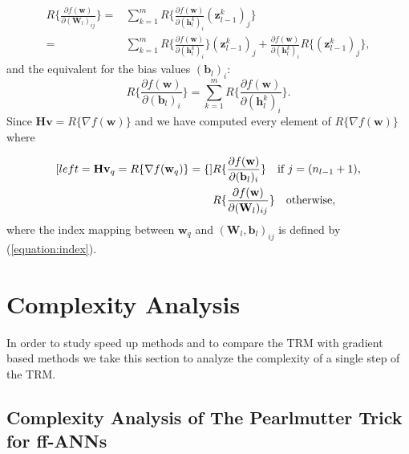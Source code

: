 \documentclass[letterpaper,12pt,titlepage,oneside,final]{book}
\begin{document}
	\begin{equation}
	\begin{split}
	R\{\frac{\partial{f(\mathbf{w})}}{\partial{(\mathbf{W}_{l})_{ij}}}\} = & \sum_{k=1}^{m}{R\{\frac{\partial{f(\mathbf{w})}}{\partial{(\mathbf{h}_{l}^{k})_{i}}}(\mathbf{z}_{l-1}^{k})_{j}\}} \\
	= & \sum_{k=1}^{m}{ R\{\frac{\partial{f(\mathbf{w})}}{\partial{(\mathbf{h}_{l}^{k})_{i}}}\}(\mathbf{z}_{l-1}^{k})_{j} + \frac{\partial{f(\mathbf{w})}}{\partial{(\mathbf{h}_{l}^{k})_{i}}}R\{(\mathbf{z}_{l-1}^{k})_{j}\}},
	\label{equation:hv_w}
	\end{split}
	\end{equation}
	and the equivalent for the bias values $(\mathbf{b}_{l})_{i}$:
	\begin{equation}
	R\{\frac{\partial{f(\mathbf{w})}}{\partial{(\mathbf{b}_{l})_{i}}}\} = \sum_{k=1}^{m}{ R\{\frac{\partial{f(\mathbf{w})}}{\partial{(\mathbf{h}_{l}^{k})_{i}}}\}}. 
	\label{equation:hv_b}
	\end{equation}
	Since $\mathbf{Hv} = R\{\nabla{f(\mathbf{w})}\}$  and we have computed every element of $R\{\nabla{f(\mathbf{w})}\}$ where
	
	\begin{subequations}
		\begin{align}[left = {\mathbf{Hv}_{q} =R\{\nabla{f(\mathbf{w}_{q})}\} =  \empheqlbrace\,}]
		& R\{\frac{\partial{f(\mathbf{w})}}{\partial{(\mathbf{b}_{l})_{i}}}\}  \quad \text{if} \ j = (n_{l-1} + 1), \\
		& R\{\frac{\partial{f(\mathbf{w})}}{\partial{(\mathbf{W}_{l})_{ij}}}\} \quad  \text{otherwise},
		\end{align}
		\label{equation:biasindex}
	\end{subequations}
	where the index mapping between $\mathbf{w}_{q}$ and $(\mathbf{W}_{l},\mathbf{b}_{l})_{ij}$ is defined by (\ref{equation:index}).
	
		\section{Complexity Analysis}
	
	In order to study speed up methods and to compare the TRM with gradient based methods we take this section to analyze the complexity of a single step of the TRM. 
	
	\subsection{Complexity Analysis of The Pearlmutter Trick for ff-ANNs}
	
\end{document}
